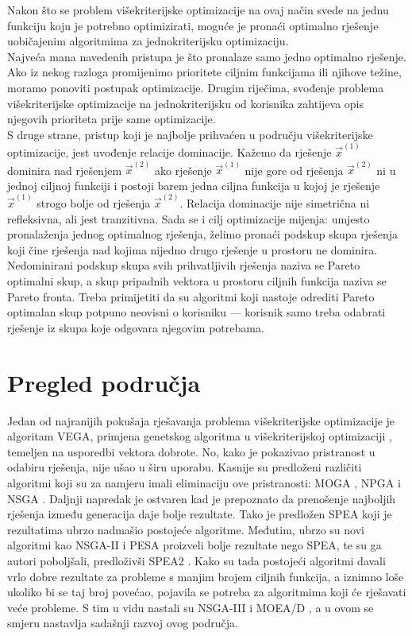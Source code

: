 \documentclass[times, utf8, zavrsni, numeric]{fer}
\begin{document}
Nakon što se problem višekriterijske optimizacije na ovaj način svede na jednu funkciju koju je potrebno optimizirati, moguće je pronaći optimalno rješenje uobičajenim algoritmima za jednokriterijsku optimizaciju.\\
Najveća mana navedenih pristupa je što pronalaze samo jedno optimalno rješenje. Ako iz nekog razloga promijenimo prioritete ciljnim funkcijama ili njihove težine, moramo ponoviti postupak optimizacije. Drugim riječima, svođenje problema višekriterijske optimizacije na jednokriterijsku od korisnika zahtijeva opis njegovih prioriteta prije same optimizacije.  \\
S druge strane, pristup koji je najbolje prihvaćen u području višekriterijske optimizacije, jest uvođenje relacije dominacije. Kažemo da rješenje $\vec{x}^{(1)}$ dominira nad rješenjem $\vec{x}^{(2)}$ ako rješenje $\vec{x}^{(1)}$ nije gore od rješenja $\vec{x}^{(2)}$ ni u jednoj ciljnoj funkciji i postoji barem jedna ciljna funkcija u kojoj je rješenje $\vec{x}^{(1)}$ strogo bolje od rješenja $\vec{x}^{(2)}$. Relacija dominacije nije simetrična ni refleksivna, ali jest tranzitivna. Sada se i cilj optimizacije mijenja: umjesto pronalaženja jednog optimalnog rješenja, želimo pronaći podskup skupa rješenja koji čine rješenja nad kojima nijedno drugo rješenje u prostoru ne dominira. Nedominirani podskup skupa svih prihvatljivih rješenja naziva se Pareto optimalni skup, a skup pripadnih vektora u prostoru ciljnih funkcija naziva se Pareto fronta. Treba primijetiti da su algoritmi koji nastoje odrediti Pareto optimalan skup potpuno neovisni o korisniku --- korisnik samo treba odabrati rješenje iz skupa koje odgovara njegovim potrebama.
\section{Pregled područja}
Jedan od najranijih pokušaja rješavanja problema višekriterijske optimizacije je algoritam VEGA, primjena genetskog algoritma u višekriterijskoj optimizaciji \citep{vega}, temeljen na usporedbi vektora dobrote. No, kako je pokazivao pristranost u odabiru rješenja, nije ušao u širu uporabu. Kasnije su predloženi različiti algoritmi koji su za namjeru imali eliminaciju ove pristranosti: MOGA \citep{moga}, NPGA \citep{npga} i NSGA \citep{nsga}. Daljnji napredak je ostvaren kad je prepoznato da prenošenje najboljih rješenja između generacija daje bolje rezultate. Tako je predložen SPEA \citep{spea} koji je rezultatima ubrzo nadmašio postojeće algoritme. Međutim, ubrzo su novi algoritmi kao NSGA-II \citep{nsga2} i PESA \citep{pesa} proizveli bolje rezultate nego SPEA, te su ga autori poboljšali, predloživši SPEA2 \citep{spea2}. Kako su tada postojeći algoritmi davali vrlo dobre rezultate za probleme s manjim brojem ciljnih funkcija, a iznimno loše ukoliko bi se taj broj povećao, pojavila se potreba za algoritmima koji će rješavati veće probleme. S tim u vidu nastali su NSGA-III \citep{nsga3} i MOEA/D \citep{moead}, a u ovom se smjeru nastavlja sadašnji razvoj ovog područja.
\end{document}
